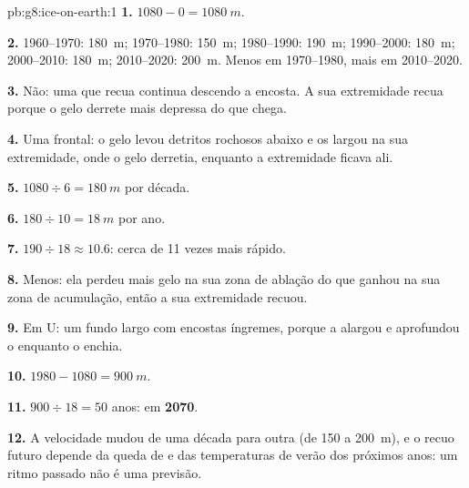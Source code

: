 \begin{solution}{pb:g8:ice-on-earth:1}
\textbf{1.} $1080 - 0 = \qty{1080}{m}$.

\textbf{2.} 1960--1970: \qty{180}{m}; 1970--1980: \qty{150}{m};
1980--1990: \qty{190}{m}; 1990--2000: \qty{180}{m}; 2000--2010:
\qty{180}{m}; 2010--2020: \qty{200}{m}. Menos em 1970--1980, mais em
2010--2020.

\textbf{3.} Não: uma  que recua continua descendo a encosta. A sua
extremidade recua porque o gelo derrete mais depressa do que chega.

\textbf{4.} Uma  frontal: o gelo levou detritos rochosos  abaixo
e os largou na sua extremidade, onde o gelo derretia, enquanto a
extremidade ficava ali.

\textbf{5.} $1080 \div 6 = \qty{180}{m}$ por década.

\textbf{6.} $180 \div 10 = \qty{18}{m}$ por ano.

\textbf{7.} $190 \div 18 \approx 10.6$: cerca de 11 vezes mais rápido.

\textbf{8.} Menos: ela perdeu mais gelo na sua zona de ablação do que
ganhou na sua zona de acumulação, então a sua extremidade recuou.

\textbf{9.} Em U: um fundo largo com encostas íngremes, porque a 
alargou e aprofundou o  enquanto o enchia.

\textbf{10.} $1980 - 1080 = \qty{900}{m}$.

\textbf{11.} $900 \div 18 = 50$ anos: em \textbf{2070}.

\textbf{12.} A velocidade mudou de uma década para outra (de 150 a
\qty{200}{m}), e o recuo futuro depende da queda de  e das
temperaturas de verão dos próximos anos: um ritmo passado não é uma
previsão.
\end{solution}
